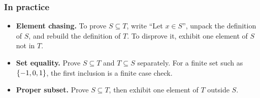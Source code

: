 \subsubsection*{In practice}
\begin{itemize}
    \item \textbf{Element chasing.} To prove $S\subseteq T$, write ``Let
    $x\in S$'', unpack the definition of $S$, and rebuild the definition of
    $T$. To disprove it, exhibit one element of $S$ not in $T$.
    \item \textbf{Set equality.} Prove $S\subseteq T$ and $T\subseteq S$
    separately. For a finite set such as $\left\{-1,0,1\right\}$, the first inclusion
    is a finite case check.
    \item \textbf{Proper subset.} Prove $S\subseteq T$, then exhibit one
    element of $T$ outside $S$.
\end{itemize}
